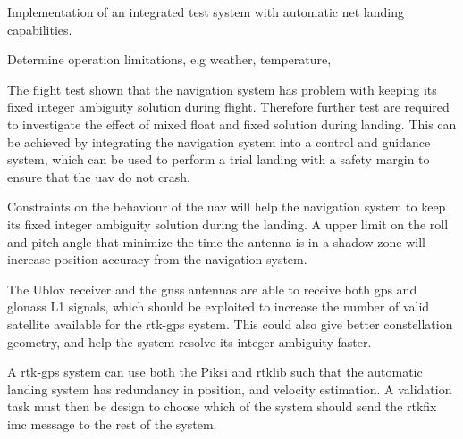 Implementation of an integrated test system with automatic net landing capabilities.

Determine operation limitations, e.g weather, temperature,

The flight test shown that the navigation system has problem with keeping its fixed integer ambiguity solution during flight. Therefore further test are required to investigate the effect of mixed float and fixed solution during landing. This can be achieved by integrating the navigation system into a control and guidance system, which can be used to perform a trial landing with a safety margin to ensure that the \gls{uav} do not crash.

Constraints on the behaviour of the \gls{uav} will help the navigation system to keep its fixed integer ambiguity solution during the landing. A upper limit on the roll and pitch angle that minimize the time the antenna is in a shadow zone will increase position accuracy from the navigation system.

The Ublox receiver and the \gls{gnss} antennas are able to receive both \gls{gps} and \gls{glonass} L1 signals, which should be exploited to increase the number of valid satellite available for the \gls{rtk-gps} system. This could also give better constellation geometry, and help the system resolve its integer ambiguity faster.
 

A \gls{rtk-gps} system can use both the Piksi and \gls{rtklib} such that the automatic landing system has redundancy in position, and velocity estimation. A validation task must then be design to choose which of the system should send the rtkfix \gls{imc} message to the rest of the system.

\cleardoublepage
